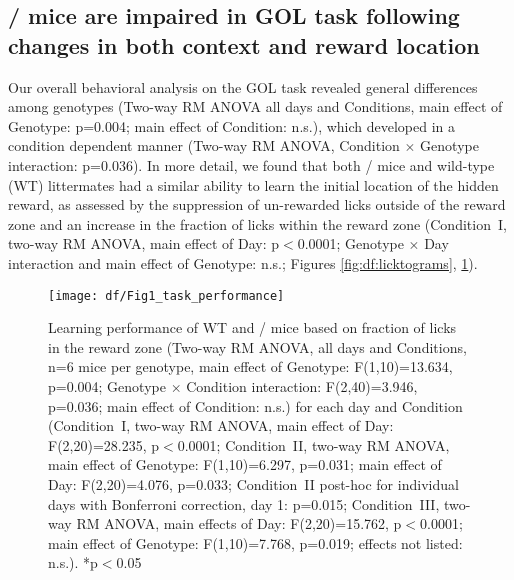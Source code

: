 \subsection{\df/ mice are impaired in GOL task following changes in both context and reward location}
\label{sec:df:results:task_performance}
Our overall behavioral analysis on the GOL task revealed general differences among genotypes (Two-way RM ANOVA all days and Conditions, main effect of Genotype: p=0.004; main effect of Condition: n.s.), which developed in a condition dependent manner (Two-way RM ANOVA, Condition $\times$ Genotype interaction: p=0.036). In more detail, we found that both \df/ mice and wild-type (WT) littermates had a similar ability to learn the initial location of the hidden reward, as assessed by the suppression of un-rewarded licks outside of the reward zone and an increase in the fraction of licks within the reward zone (Condition~I, two-way RM ANOVA, main effect of Day: p$<$0.0001; Genotype $\times$ Day interaction and main effect of Genotype: n.s.; Figures \ref{fig:df:licktograms}, \ref{fig:df:task_performance}).
\begin{figure}
	\centering
	\texttt{[image: df/Fig1\_task\_performance]}
	\caption[Learning performance of WT and \df/ mice based on fraction of licks in the reward zone]{Learning performance of WT and \df/ mice based on fraction of licks in the reward zone (Two-way RM ANOVA, all days and Conditions, n=6 mice per genotype, main effect of Genotype: F(1,10)=13.634, p=0.004; Genotype $\times$ Condition interaction: F(2,40)=3.946, p=0.036; main effect of Condition: n.s.) for each day and Condition (Condition~I, two-way RM ANOVA, main effect of Day: F(2,20)=28.235, p$<$0.0001; Condition~II, two-way RM ANOVA, main effect of Genotype: F(1,10)=6.297, p=0.031; main effect of Day: F(2,20)=4.076, p=0.033; Condition~II post-hoc for individual days with Bonferroni correction, day 1: p=0.015; Condition~III, two-way RM ANOVA, main effects of Day: F(2,20)=15.762, p$<$0.0001; main effect of Genotype: F(1,10)=7.768, p=0.019; effects not listed: n.s.).  *p$<$0.05}
	\label{fig:df:task_performance}
\end{figure}
